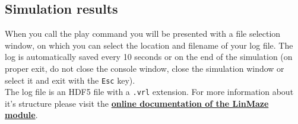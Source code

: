 \documentclass[11pt,a4paper]{article}
\newcommand{\param}[1]{\item \texttt{#1} -}
\begin{document}
\subsection{Simulation results}
When you call the play command you will be presented with a file selection window, on which you can select the location and filename of your log file. The log is automatically saved every 10 seconds or on the end of the simulation (on proper exit, do not close the console window, close the simulation window or select it and exit with the \texttt{Esc} key).\\

The log file is an HDF5 file with a \texttt{.vrl} extension. For more information about it's structure please visit the \href{http://gramophonetools.readthedocs.io/en/latest/linmaze_out.html}{\textbf{online documentation of the LinMaze module}}.


\end{document}
